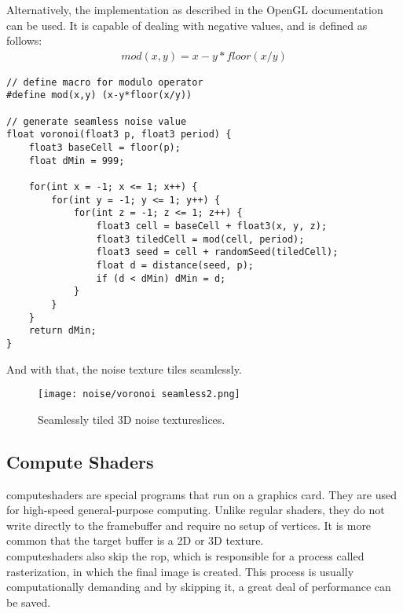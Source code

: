 \noindent
Alternatively, the implementation as described in the OpenGL documentation \cite{opengl:mod} can be used.
It is capable of dealing with negative values, and is defined as follows:
$$
\begin{array}{l}
    mod(x, y) = x - y * floor(x/y)
\end{array}
$$

\begin{lstlisting}[language=HLSL, caption=Implementation of seamless 3D Voronoi \gls{noise} algorithm., label=lst:shader:noise:voronoi:seamless2]
// define macro for modulo operator
#define mod(x,y) (x-y*floor(x/y))

// generate seamless noise value
float voronoi(float3 p, float3 period) {
    float3 baseCell = floor(p);
    float dMin = 999;

    for(int x = -1; x <= 1; x++) {
        for(int y = -1; y <= 1; y++) {
            for(int z = -1; z <= 1; z++) {
                float3 cell = baseCell + float3(x, y, z);
                float3 tiledCell = mod(cell, period);
                float3 seed = cell + randomSeed(tiledCell);
                float d = distance(seed, p);
                if (d < dMin) dMin = d;
            }
        }
    }
    return dMin;
}
\end{lstlisting}

\noindent
And with that, the \gls{noise} texture tiles seamlessly.

\begin{figure}[H]
    \texttt{[image: noise/voronoi seamless2.png]}
    \caption{Seamlessly tiled 3D \gls{noise} \gls{textureslice}s.}
    \label{img:rnd:noise:seamless2}
\end{figure}

\subsection{Compute Shaders}
\label{section:noise:compute}
\Gls{computeshader}s are special programs that run on a graphics card. They are used for high-speed general-purpose computing.
Unlike regular \gls{shader}s, they do not write directly to the \gls{framebuffer} and require no setup of vertices.
It is more common that the target buffer is a 2D or 3D texture.
\\
\Gls{computeshader}s also skip the \gls{rop}, which is responsible for a process called \gls{rasterization}, in which the final image is created.
This process is usually computationally demanding and by skipping it, a great deal of performance can be saved.

